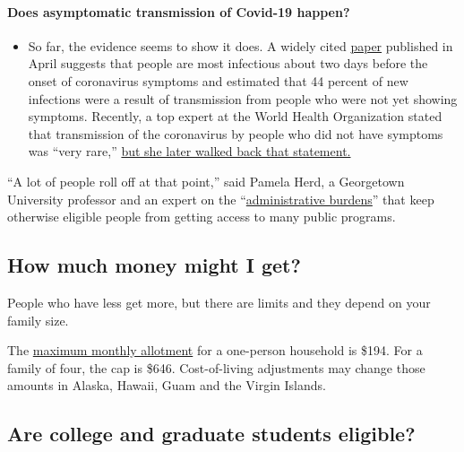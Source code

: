 \begin{itemize}
{  \paragraph{Does asymptomatic transmission of Covid-19
  happen?}\label{does-asymptomatic-transmission-of-covid-19-happen}}

  \begin{itemize}
  \tightlist
  \item
    So far, the evidence seems to show it does. A widely cited
    \href{https://www.nature.com/articles/s41591-020-0869-5}{paper}
    published in April suggests that people are most infectious about
    two days before the onset of coronavirus symptoms and estimated that
    44 percent of new infections were a result of transmission from
    people who were not yet showing symptoms. Recently, a top expert at
    the World Health Organization stated that transmission of the
    coronavirus by people who did not have symptoms was ``very rare,''
    \href{https://www.nytimes.com/2020/06/09/world/coronavirus-updates.html?action=click\&pgtype=Article\&state=default\&region=MAIN_CONTENT_3\&context=storylines_faq\#link-1f302e21}{but
    she later walked back that statement.}
  \end{itemize}
\end{itemize}

``A lot of people roll off at that point,'' said Pamela Herd, a
Georgetown University professor and an expert on the
``\href{https://www.russellsage.org/publications/administrative-burden}{administrative
burdens}'' that keep otherwise eligible people from getting access to
many public programs.

\hypertarget{how-much-money-might-i-get}{%
\subsection{How much money might I
get?}\label{how-much-money-might-i-get}}

People who have less get more, but there are limits and they depend on
your family size.

The \href{https://www.fns.usda.gov/snap/recipient/eligibility}{maximum
monthly allotment} for a one-person household is \$194. For a family of
four, the cap is \$646. Cost-of-living adjustments may change those
amounts in Alaska, Hawaii, Guam and the Virgin Islands.

\hypertarget{are-college-and-graduate-students-eligible}{%
\subsection{Are college and graduate students
eligible?}\label{are-college-and-graduate-students-eligible}}

